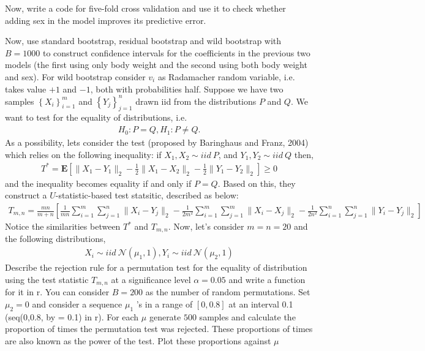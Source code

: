 \begin{solution}
\hfill\break
\hfill\break
Now, write a code for five-fold cross validation and use it to check whether adding sex in the model improves its predictive error.

Now, use standard bootstrap, residual bootstrap and wild bootstrap with $B = 1000$ to construct confidence intervals for the coefficients in the previous two models (the first using only body weight and the second using both body weight and sex). For wild bootstrap consider $v_i$ as Radamacher random variable, i.e. takes value $+1$ and $-1$, both with probabilities half.
\hfill\break
\hfill\break
Suppose we have two samples $\left\{ X_i \right\}_{i =1}^m$ and $\left\{ Y_j \right\}_{j = 1}^n$ drawn iid from the distributions $P$ and $Q$. We want to test for the equality of distributions, i.e.
\begin{align*}
H_0 : P = Q, H_1 : P \neq Q.
\end{align*}
As a possibility, lets consider the test (proposed by Baringhaus and Franz, 2004) which relies on the following inequality: if $X_1, X_2 \sim iid \ P$, and $Y_1, Y_2 \sim iid \ Q$ then,
\begin{align*}
T^* = \mathbf{E}\left[ \lVert X_1 - Y_1 \rVert_2 - \frac{1}{2} \lVert X_1 - X_2 \rVert_2 - \frac{1}{2} \lVert Y_1 - Y_2 \rVert_2 \right] \geq 0
\end{align*}
and the inequality becomes equality if and only if $P = Q$. Based on this, they construct a $U$-statistic-based test statsitic, described as below:
\begin{align*}
T_{m,n} = \frac{mn}{m + n} \left[ \frac{1}{mn} \sum_{i = 1}^{ m}\sum_{j = 1}^{ n } \lVert X_i - Y_j \rVert_2 - \frac{1}{2m^2} \sum_{i = 1}^{ m }\sum_{j = 1}^{ m } \lVert X_i - X_j \rVert_2 - \frac{1}{2n^2}\sum_{i = 1}^{ n} \sum_{j = 1}^{ n } \lVert Y_i - Y_j \rVert_2 \right]
\end{align*}
Notice the similarities between $T^*$ and $T_{m,n}$. Now, let's consider $m = n = 20$ and the following distributions,
\begin{align*}
X_i \sim iid \ \mathcal{N}(\mu_1, 1), Y_i \sim iid \ \mathcal{N}(\mu_2,1)
\end{align*}
Describe the rejection rule for a permutation test for the equality of distribution using the test statistic $T_{m,n}$ at a significance level $\alpha = 0.05$ and write a function for it in r. You can consider $B = 200$ as the number of random permutations.
\hfill\break
\hfill\break
Set $\mu_2 = 0$ and consider a sequence $\mu_1$ 's in a range of $[0,0.8]$ at an interval  0.1 (seq(0,0.8, by = 0.1) in r). For each $\mu$ generate $500$ samples and calculate the proportion of times the permutation test was rejected. These proportions of times are also known as the power of the test. Plot these proportions against $\mu$

\end{solution}
